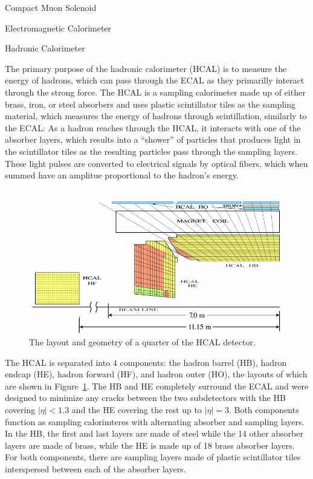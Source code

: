\begin{section}{Compact Muon Solenoid}
\begin{subsection}{Electromagnetic Calorimeter}
\end{subsection}

\begin{subsection}{Hadronic Calorimeter}

The primary purpose of the hadronic calorimeter (HCAL) is to measure the energy of hadrons, which can pass through the ECAL as they primarilly interact through the strong force.
The HCAL is a sampling calorimeter made up of either brass, iron, or steel absorbers and uses plastic scintillator tiles as the sampling material, which measures the energy of hadrons through scintillation, similarly to the ECAL:
As a hadron reaches through the HCAL, it interacts with one of the absorber layers, which results into a ``shower'' of particles that produces light in the scintillator tiles as the resulting particles pass through the sampling layers.
These light pulses are converted to electrical signals by optical fibers, which when summed have an amplitue proportional to the hadron's energy. 

\begin{figure}[tbp!]
\begin{center}
\includegraphics[angle=0,width=0.80\columnwidth]{fig/cms_hcal.png}
\end{center}
\caption{The layout and geometry of a quarter of the HCAL detector.~\cite{1748-0221-5-03-T03014}}
\label{fig:cms_hcal}
\end{figure}

The HCAL is separated into 4 components: the hadron barrel (HB), hadron endcap (HE), hadron forward (HF), and hadron outer (HO), the layouts of which are shown in Figure~\ref{fig:cms_hcal}.
The HB and HE completely surround the ECAL and were designed to minimize any cracks between the two subdetectors with the HB covering $|\eta|<1.3$ and the HE covering the rest up to $|\eta|=3$.
Both components function as sampling calorimteres with alternating absorber and sampling layers.
In the HB, the first and last layers are made of steel while the 14 other absorber layers are made of brass, while the HE is made up of 18 brass absorber layers.
For both components, there are sampling layers made of plastic scintillator tiles interspersed between each of the absorber layers.


\end{subsection}
\end{section}
